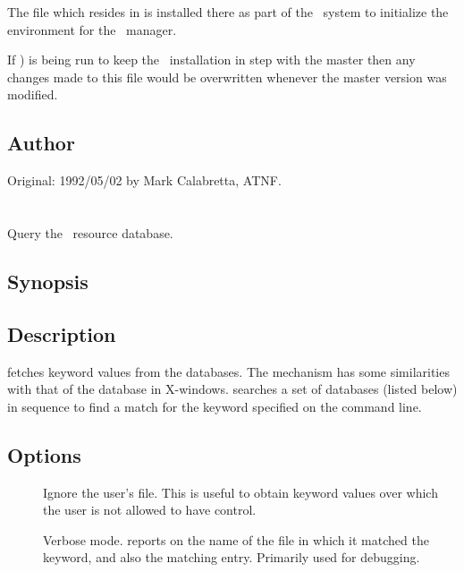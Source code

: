 The  file which resides in  is installed there as
part of the \aipspp\ system to initialize the  environment for the
\aipspp\ manager.

If ) is being run to keep the \aipspp\ installation in step
with the master then any changes made to this file would be overwritten
whenever the master version was modified.

\subsection*{Author}

Original: 1992/05/02 by Mark Calabretta, ATNF.


\newpage
\section{}
\label{getrc}



Query the \aipspp\ resource database.

\subsection*{Synopsis}

\begin{synopsis}
\end{synopsis}

\subsection*{Description}

 fetches keyword values from the  databases.  The
mechanism has some similarities with that of the  database in
X-windows.   searches a set of  databases (listed
below) in sequence to find a match for the keyword specified on the command
line.

\subsection*{Options}

\begin{description}
\item[]
   Ignore the user's  file.  This is useful to obtain keyword
   values over which the user is not allowed to have control.

\item[]
   Verbose mode.   reports on  the name of the file in
   which it matched the keyword, and also the matching entry.  Primarily used
   for debugging.
\end{description}

